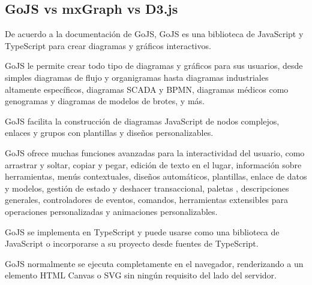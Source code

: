 \subsection{GoJS vs mxGraph vs D3.js}
De acuerdo a la documentación de GoJS\cite{noauthor_gojs_nodate}, GoJS es una biblioteca de JavaScript y TypeScript para crear diagramas y gráficos interactivos.


GoJS le permite crear todo tipo de diagramas y gráficos para sus usuarios, desde simples diagramas de flujo y organigramas hasta diagramas industriales altamente específicos, diagramas SCADA y BPMN, diagramas médicos como genogramas y diagramas de modelos de brotes, y más. 


GoJS facilita la construcción de diagramas JavaScript de nodos complejos, enlaces y grupos con plantillas y diseños personalizables.


GoJS ofrece muchas funciones avanzadas para la interactividad del usuario, como arrastrar y soltar, copiar y pegar, edición de texto en el lugar, información sobre herramientas, menús contextuales, diseños automáticos, plantillas, enlace de datos y modelos, gestión de estado y deshacer transaccional, paletas , descripciones generales, controladores de eventos, comandos, herramientas extensibles para operaciones personalizadas y animaciones personalizables.


GoJS se implementa en TypeScript y puede usarse como una biblioteca de JavaScript o incorporarse a su proyecto desde fuentes de TypeScript. 


GoJS normalmente se ejecuta completamente en el navegador, renderizando a un elemento HTML Canvas o SVG sin ningún requisito del lado del servidor.


